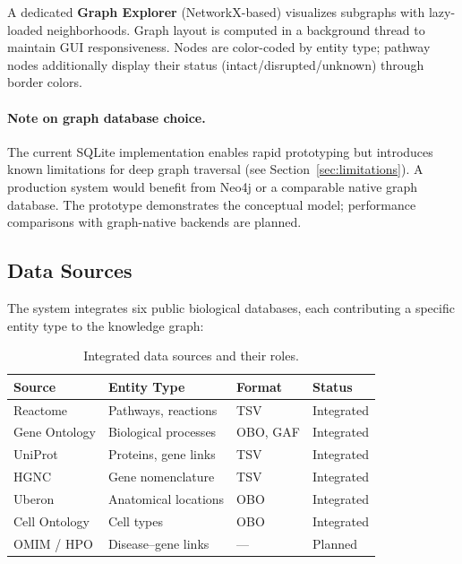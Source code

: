\documentclass[12pt,a4paper]{article}
\begin{document}
A dedicated \textbf{Graph Explorer} (NetworkX-based) visualizes subgraphs with lazy-loaded neighborhoods. Graph layout is computed in a background thread to maintain GUI responsiveness. Nodes are color-coded by entity type; pathway nodes additionally display their status (intact/disrupted/unknown) through border colors.

\paragraph{Note on graph database choice.} The current SQLite implementation enables rapid prototyping but introduces known limitations for deep graph traversal (see Section~\ref{sec:limitations}). A production system would benefit from Neo4j or a comparable native graph database. The prototype demonstrates the conceptual model; performance comparisons with graph-native backends are planned.

\subsection{Data Sources}
\label{sec:datasources}

The system integrates six public biological databases, each contributing a specific entity type to the knowledge graph:

\begin{table}[H]
\centering
\caption{Integrated data sources and their roles.}
\label{tab:datasources}
\begin{tabular}{llll}
\toprule
\textbf{Source} & \textbf{Entity Type} & \textbf{Format} & \textbf{Status} \\
\midrule
Reactome \citep{Fabregat2018} & Pathways, reactions & TSV & Integrated \\
Gene Ontology \citep{Ashburner2000} & Biological processes & OBO, GAF & Integrated \\
UniProt \citep{UniProt2023} & Proteins, gene links & TSV & Integrated \\
HGNC \citep{Braschi2019} & Gene nomenclature & TSV & Integrated \\
Uberon \citep{Mungall2012} & Anatomical locations & OBO & Integrated \\
Cell Ontology \citep{Diehl2016} & Cell types & OBO & Integrated \\
OMIM / HPO \citep{Robinson2008} & Disease--gene links & --- & Planned \\
\bottomrule
\end{tabular}
\end{table}
\end{document}
